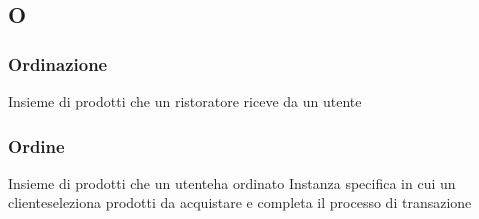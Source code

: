 \subsection{O}

\subsubsection{Ordinazione}
Insieme di prodotti che un ristoratore riceve da un utente\g

\subsubsection{Ordine}
Insieme di prodotti che un utente\g ha ordinato 
Instanza specifica in cui un cliente\g seleziona prodotti da acquistare e completa il processo di transazione


